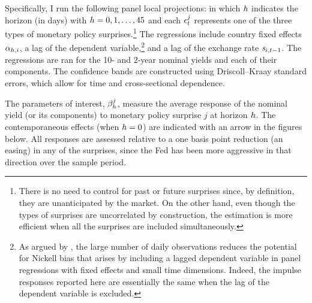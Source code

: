 {Specifically, I run the following panel local projections:
\noindent in which 
\(h\) indicates the horizon (in days) with \(h = 0, 1, \ldots, 45\) and each \(\epsilon^{j}_{t}\) represents one of the three types of monetary policy surprises.\footnote{ There is no need to control for past or future surprises since, by definition, they are unanticipated by the market. On the other hand, even though the types of surprises are uncorrelated by construction, the estimation is more efficient when all the surprises are included simultaneously.} %
The regressions include country fixed effects \(\alpha_{h,i}\), a lag of the dependent variable,\footnote{ As argued by \cite{HofmannShimShin:2019}, the large number of daily observations reduces the potential for Nickell bias that arises by including a lagged dependent variable in panel regressions with fixed effects and small time dimensions. Indeed, the impulse responses reported here are essentially the same when the lag of the dependent variable is excluded.} %
and a lag of the exchange rate \(\mathit{s}_{i,{t-1}}\). %
The regressions are ran for the 10- and 2-year nominal yields and each of their components.
The confidence bands are constructed using Driscoll--Kraay standard errors, which allow for time and cross-sectional dependence.

The parameters of interest, \(\beta^{j}_{h}\), measure the average response of the nominal yield (or its components) to monetary policy surprise \(j\) at horizon \(h\). 
The contemporaneous effects (when \(h = 0\)) are indicated with an arrow in the figures below.
All responses are assessed relative to a one basis point reduction (an easing) in any of the surprises, since the Fed has been more aggressive in that direction over the sample period.

}
